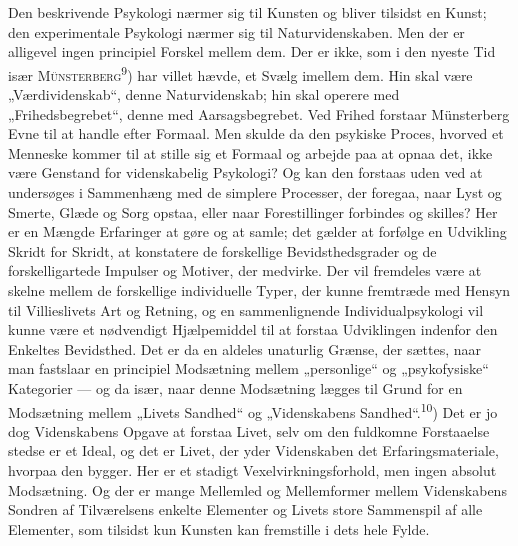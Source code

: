\documentclass[12pt,a4paper,openany]{book}
\newcommand{\opage}[1]{\marginnote{\footnotesize\textit{[#1]}}}
\begin{document}
Den beskrivende Psykologi nærmer sig til Kunsten og bliver tilsidst en Kunst;
den experimentale Psykologi nærmer sig til Naturvidenskaben. Men der er
alligevel ingen principiel Forskel mellem dem. Der er ikke, som i den nyeste
Tid især \textsc{Münsterberg}\textsuperscript{9}) har villet hævde, et Svælg
imellem dem. Hin skal være „Værdividenskab“, denne Naturvidenskab; hin skal
operere med „Frihedsbegrebet“, denne med Aarsagsbegrebet. Ved Frihed forstaar
Münsterberg Evne til at handle efter Formaal. Men skulde da den psykiske
Proces, hvorved et Menneske kommer til at stille sig et Formaal og arbejde paa
at opnaa det, ikke være Genstand for videnskabelig Psykologi? Og kan den
forstaas uden ved at undersøges i Sammenhæng med de simplere Processer, der
foregaa, naar Lyst og Smerte, Glæde og Sorg opstaa, eller naar Forestillinger
forbindes og skilles? Her er en Mængde Erfaringer at gøre og at samle; det
gælder at forfølge en Udvikling Skridt for Skridt, at konstatere de forskellige
Bevidsthedsgrader og de forskelligartede Impulser og Motiver, der
\opage{12}medvirke. Der vil fremdeles være at skelne mellem de forskellige
individuelle Typer, der kunne fremtræde med Hensyn til Villieslivets Art og
Retning, og en sammenlignende Individualpsykologi vil kunne være et nødvendigt
Hjælpemiddel til at forstaa Udviklingen indenfor den Enkeltes Bevidsthed. Det
er da en aldeles unaturlig Grænse, der sættes, naar man fastslaar en principiel
Modsætning mellem „personlige“ og „psykofysiske“ Kategorier --- og da især,
naar denne Modsætning lægges til Grund for en Modsætning mellem „Livets
Sandhed“ og „Videnskabens Sandhed“.\textsuperscript{10}) Det er jo dog
Videnskabens Opgave at forstaa Livet, selv om den fuldkomne Forstaaelse stedse
er et Ideal, og det er Livet, der yder Videnskaben det Erfaringsmateriale,
hvorpaa den bygger. Her er et stadigt Vexelvirkningsforhold, men ingen absolut
Modsætning. Og der er mange Mellemled og Mellemformer mellem Videnskabens
Sondren af Tilværelsens enkelte Elementer og Livets store Sammenspil af alle
Elementer, som tilsidst kun Kunsten kan fremstille i dets hele Fylde.
\end{document}
